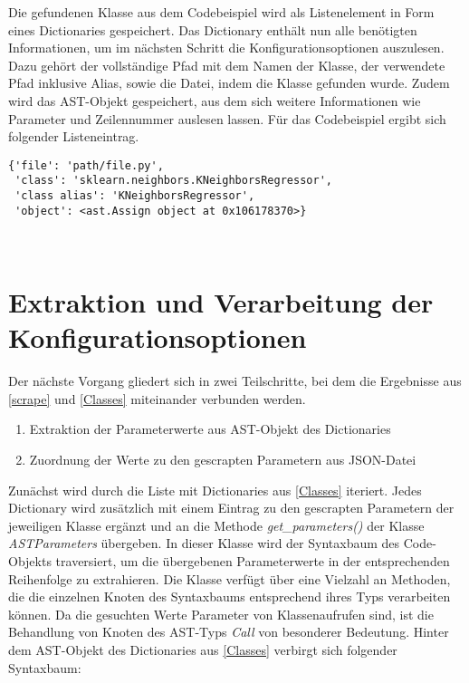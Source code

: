 \documentclass[german,bachelor]{swsLeipzig}
\begin{document}
Die gefundenen Klasse aus dem Codebeispiel wird als Listenelement in Form eines Dictionaries gespeichert.
Das Dictionary enthält nun alle benötigten Informationen, um im nächsten Schritt
die Konfigurationsoptionen auszulesen.
Dazu gehört der vollständige Pfad mit dem Namen der Klasse, der verwendete Pfad inklusive Alias, sowie die Datei, indem
die Klasse gefunden wurde.
Zudem wird das AST-Objekt gespeichert, aus dem sich weitere Informationen wie Parameter und Zeilennummer auslesen lassen.
Für das Codebeispiel ergibt sich folgender Listeneintrag.\\

\begin{lstlisting}[frame=single, basicstyle=\small]
{'file': 'path/file.py',
 'class': 'sklearn.neighbors.KNeighborsRegressor',
 'class alias': 'KNeighborsRegressor',
 'object': <ast.Assign object at 0x106178370>}
\end{lstlisting}
\

\section{Extraktion und Verarbeitung der Konfigurationsoptionen} \label{Parameters}
Der nächste Vorgang gliedert sich in zwei Teilschritte, bei dem die Ergebnisse aus \ref{scrape} und \ref{Classes} miteinander
verbunden werden.

\begin{enumerate}
 \item Extraktion der Parameterwerte aus AST-Objekt des Dictionaries
 \item Zuordnung der Werte zu den gescrapten Parametern aus JSON-Datei
\end{enumerate}

Zunächst wird durch die Liste mit Dictionaries aus \ref{Classes} iteriert.
Jedes Dictionary wird zusätzlich mit einem Eintrag zu den gescrapten Parametern der jeweiligen Klasse ergänzt und an die Methode \textit{get\_parameters()}
der Klasse \textit{ASTParameters} übergeben.
In dieser Klasse wird der Syntaxbaum des Code-Objekts traversiert, um die übergebenen Parameterwerte in der
entsprechenden Reihenfolge zu extrahieren.
Die Klasse verfügt über eine Vielzahl an Methoden, die die einzelnen Knoten des Syntaxbaums entsprechend ihres Typs
verarbeiten können.
Da die gesuchten Werte Parameter von Klassenaufrufen sind, ist die Behandlung von Knoten des AST-Typs \textit{Call} von
besonderer Bedeutung.
Hinter dem AST-Objekt des Dictionaries aus \ref{Classes} verbirgt sich folgender Syntaxbaum: \\
\end{document}

